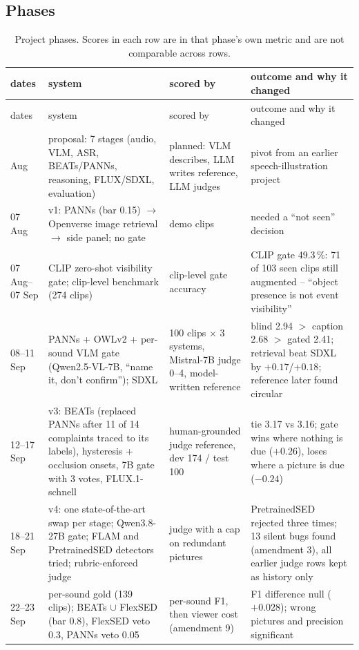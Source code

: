 \subsection{Phases}
\begin{longtable}{L{1.7cm}L{4.2cm}L{3.6cm}L{5.2cm}}
\caption{Project phases. Scores in each row are in that phase's own metric and are not comparable across rows.}\label{tab:eras}\\
\toprule
dates & system & scored by & outcome and why it changed \\
\midrule\endfirsthead
\toprule dates & system & scored by & outcome and why it changed \\ \midrule\endhead
\bottomrule{} Aug & proposal: 7 stages (audio, VLM, ASR, BEATs/PANNs, reasoning, FLUX/SDXL, evaluation) & planned: VLM describes, LLM writes reference, LLM judges & pivot from an earlier speech-illustration project \\
07 Aug & v1: PANNs (bar 0.15) $\to$ Openverse image retrieval $\to$ side panel; no gate & demo clips & needed a ``not seen'' decision \\
07 Aug--07 Sep & CLIP zero-shot visibility gate; clip-level benchmark (274 clips) & clip-level gate accuracy & CLIP gate 49.3\,\%: 71 of 103 seen clips still augmented -- ``object presence is not event visibility'' \\
08--11 Sep & PANNs + OWLv2 + per-sound VLM gate (Qwen2.5-VL-7B, ``name it, don't confirm''); SDXL & 100 clips $\times$ 3 systems, Mistral-7B judge 0--4, model-written reference & blind 2.94 $>$ caption 2.68 $>$ gated 2.41; retrieval beat SDXL by $+0.17$/$+0.18$; reference later found circular \\
12--17 Sep & v3: BEATs (replaced PANNs after 11 of 14 complaints traced to its labels), hysteresis + occlusion onsets, 7B gate with 3 votes, FLUX.1-schnell & human-grounded judge reference, dev 174 / test 100 & tie 3.17 vs 3.16; gate wins where nothing is due ($+0.26$), loses where a picture is due ($-0.24$) \\
18--21 Sep & v4: one state-of-the-art swap per stage; Qwen3.8-27B gate; FLAM and PretrainedSED detectors tried; rubric-enforced judge & judge with a cap on redundant pictures & PretrainedSED rejected three times; 13 silent bugs found (amendment 3), all earlier judge rows kept as history only \\
22--23 Sep & per-sound gold (139 clips); BEATs $\cup$ FlexSED (bar 0.8), FlexSED veto 0.3, PANNs veto 0.05 & per-sound F1, then viewer cost (amendment 9) & F1 difference null ($+0.028$); wrong pictures and precision significant \\

\end{longtable}
